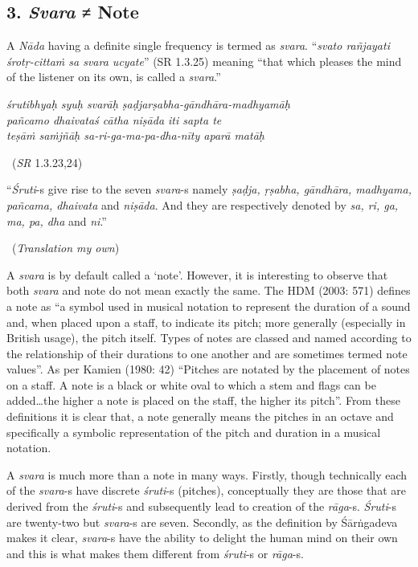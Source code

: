\subsection*{3. \textit{Svara} ≠ Note}

A \textit{Nāda} having a definite single frequency is termed as \textit{svara}. “\textit{svato rañjayati śrotṛ-cittaṁ sa svara ucyate}” (SR 1.3.25) meaning “that which pleases the mind of the listener on its own, is called a \textit{svara}.”

\begin{myquote}
\textit{śrutibhyaḥ syuḥ svarāḥ ṣaḍjarṣabha-gāndhāra-madhyamāḥ }\\ \textit{pañcamo dhaivataś cātha niṣāda iti sapta te }\\ \textit{teṣāṁ saṁjñāḥ sa-ri-ga-ma-pa-dha-nīty aparā matāḥ } 

~\hfill (\textit{SR} 1.3.23,24)
\end{myquote}

\begin{myquote}
“\textit{Śruti}-s give rise to the seven \textit{svara}-s namely \textit{ṣaḍja, ṛṣabha, gāndhāra, madhyama, pañcama, dhaivata} and \textit{niṣāda}. And they are respectively denoted by \textit{sa, ri, ga, ma, pa, dha} and \textit{ni}.” 

~\hfill (\textit{Translation my own})
\end{myquote}

A \textit{svara} is by default called a ‘note’. However, it is interesting to observe that both \textit{svara} and note do not mean exactly the same. The HDM (2003: 571) defines a note as “a symbol used in musical notation to represent the duration of a sound and, when placed upon a staff, to indicate its pitch; more generally (especially in British usage), the pitch itself. Types of notes are classed and named according to the relationship of their durations to one another and are sometimes termed note values”. As per Kamien (1980: 42) “Pitches are notated by the placement of notes on a staff. A note is a black or white oval to which a stem and flags can be added…the higher a note is placed on the staff, the higher its pitch”. From these definitions it is clear that, a note generally means the pitches in an octave and specifically a symbolic representation of the pitch and duration in a musical notation. 

A \textit{svara} is much more than a note in many ways. Firstly, though technically each of the \textit{svara}-s have discrete \textit{śruti}-s (pitches), conceptually they are those that are derived from the \textit{śruti}-s and subsequently lead to creation of the \textit{rāga}-s. \textit{Śruti}-s are twenty-two but \textit{svara}-s are seven. Secondly, as the definition by Śārṅgadeva makes it clear, \textit{svara}-s have the ability to delight the human mind on their own and this is what makes them different from \textit{śruti}-s or \textit{rāga}-s.



